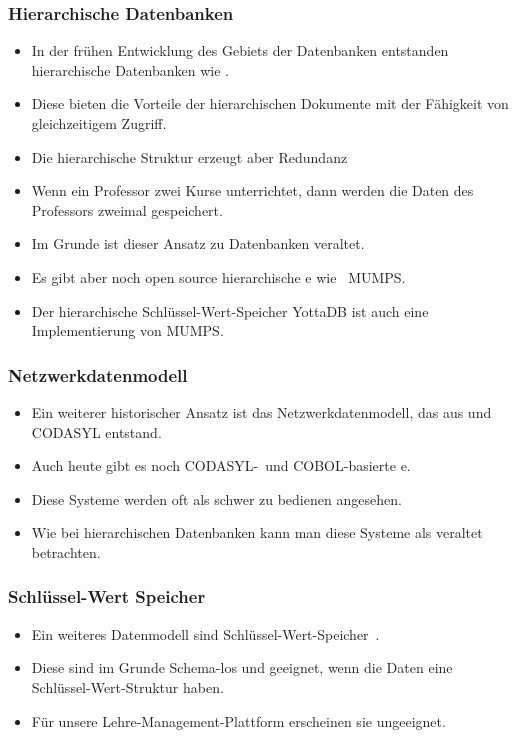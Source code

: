 \documentclass[aspectratio=169,mathserif,notheorems]{beamer}%
\begin{document}
%
\begin{frame}%
\frametitle{Hierarchische Datenbanken}%
\begin{itemize}%
\item In der frühen Entwicklung des Gebiets der Datenbanken entstanden hierarchische Datenbanken wie \cite{KLBGNLWBS2012ITIYCGTIIMS,BBP2007TBOI,KC2024DS:ITD}.%
%
\item<2-> Diese bieten die Vorteile der hierarchischen Dokumente mit der Fähigkeit von gleichzeitigem Zugriff.%
%
\item<3-> Die hierarchische Struktur erzeugt aber Redundanz%
%
\item<4-> Wenn ein Professor zwei Kurse unterrichtet, dann werden die Daten des Professors zweimal gespeichert.%
%
\item<5-> Im Grunde ist dieser Ansatz zu Datenbanken veraltet.%
%
\item<6-> Es gibt aber noch open source hierarchische e wie \DEzB\ MUMPS\cite{O2008TMPL,O2025TMPL}.%
%
\item<7-> Der hierarchische Schlüssel-Wert-Speicher YottaDB ist auch eine Implementierung von MUMPS\cite{B2018THALOMMATFOY}.%
%
\end{itemize}%
\end{frame}%
%
\begin{frame}%
\frametitle{Netzwerkdatenmodell}%
\begin{itemize}%
\item Ein weiterer historischer Ansatz ist das Netzwerkdatenmodell, das aus \cite{B2009TOOTIDSITFDAD,B1965SFRAP,H2016HCBITDAFOODW} und CODASYL\cite{TF1976CDBMS} entstand.%
%
\item<2-> Auch heute gibt es noch CODASYL-\ und COBOL-basierte e\cite{O2022OCDDARM}.%
%
\item<3-> Diese Systeme werden oft als schwer zu bedienen angesehen.%
%
\item<4-> Wie bei hierarchischen Datenbanken kann man diese Systeme als veraltet betrachten.%
%
\end{itemize}%
\end{frame}%
%
\begin{frame}%
\frametitle{Schlüssel-Wert Speicher}%
\begin{itemize}%
\item Ein weiteres Datenmodell sind Schlüssel-Wert-Speicher~.%
%
\item<2-> Diese sind im Grunde Schema-los und geeignet, wenn die Daten eine Schlüssel-Wert-Struktur haben.%
%
\item<3-> Für unsere Lehre-Management-Plattform erscheinen sie ungeeignet.%
\end{itemize}%
\end{frame}%
\end{document}
